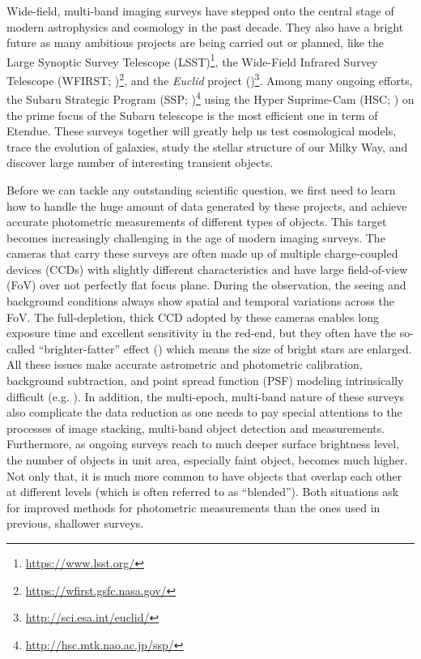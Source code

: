 \documentclass[useamsfonts]{pasj01}
\begin{document}
    Wide-field, multi-band imaging surveys have stepped onto the central stage of 
    modern astrophysics and cosmology in the past decade. 
    They also have a bright future as many ambitious projects are being carried out 
    or planned, like the Large Synoptic Survey Telescope 
    (LSST)\footnote{\url{https://www.lsst.org/}}, the Wide-Field Infrared Survey 
    Telescope 
    (WFIRST; \citealt{Dressler2012})\footnote{\url{https://wfirst.gsfc.nasa.gov/}}, 
    and the \textit{Euclid} project 
    (\citealt{Laureijs2012})\footnote{\url{http://sci.esa.int/euclid/}}.
    Among many ongoing efforts, the Subaru Strategic Program 
    (SSP; \citealt{HSCDR1})\footnote{\url{http://hsc.mtk.nao.ac.jp/ssp/}}
    using the Hyper Suprime-Cam (HSC; \citealt{Miyazaki2012}) on the prime focus of 
    the Subaru telescope is the most efficient one in term of Etendue. 
    These surveys together will greatly help us test cosmological models, trace the 
    evolution of galaxies, study the stellar structure of our Milky Way, and discover 
    large number of interesting transient objects.
    
    Before we can tackle any outstanding scientific question, we first need to learn 
    how to handle the huge amount of data generated by these projects, and achieve 
    accurate photometric measurements of different types of objects.  
    This target becomes increasingly challenging in the age of modern imaging 
    surveys. 
    The cameras that carry these surveys are often made up of multiple 
    charge-coupled devices (CCDs) with slightly different characteristics and have 
    large field-of-view (FoV) over not perfectly flat focus plane.
    During the observation, the seeing and background conditions always show spatial 
    and temporal variations across the FoV.
    The full-depletion, thick CCD adopted by these cameras enables long exposure time 
    and excellent sensitivity in the red-end, but they often have the so-called 
    ``brighter-fatter'' effect (\citealt{Antilogus2014}) which means the size of bright
    stars are enlarged.
    All these issues make accurate astrometric and photometric calibration, 
    background subtraction, and point spread function (PSF) modeling intrinsically
    difficult (e.g. \citealt{Schlafly2012}).
    In addition, the multi-epoch, multi-band nature of these surveys also complicate 
    the data reduction as one needs to pay special attentions to the processes of 
    image stacking, multi-band object detection and measurements. 
    Furthermore, as ongoing surveys reach to much deeper surface brightness level, 
    the number of objects in unit area, especially faint object, becomes much higher.
    Not only that, it is much more common to have objects that overlap each other at
    different levels (which is often referred to as ``blended''). 
    Both situations ask for improved methods for photometric measurements than the ones
    used in previous, shallower surveys. 
\end{document}
